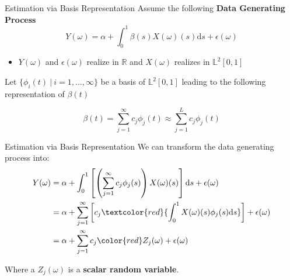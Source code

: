 \documentclass{beamer}
\begin{document}
	\begin{frame}{Estimation via Basis Representation}
		Assume the following \textbf{Data Generating Process}
		$$Y(\omega) = \alpha + \int_{0}^{1} \beta(s) X(\omega)(s) \mathrm{d}s + \epsilon(\omega)$$
		\vspace{-0.6cm}
		\begin{itemize}
			\item $Y(\omega)$ and $\epsilon(\omega)$ realize in $\mathbb{R}$ and $X(\omega)$ realizes in $\mathbb{L}^2[0,1]$
		\end{itemize}
		\vspace{0.3cm}
					
		Let $\{\phi_i(t) \: \vert \: i = 1, \dots, \infty\}$ be a basis of $\mathbb{L}^2[0,1]$ leading to the following representation of $\beta(t)$
		
		$$\beta(t) = \sum_{j = 1}^{\infty} c_j \phi_j(t) \approx \sum_{j = 1}^{L} c_j \phi_j(t)$$

	\end{frame}

	\begin{frame}{Estimation via Basis Representation}
		We can transform the data generating process into:
		\begin{equation}\notag
			\begin{split}
				Y(\omega) & = \alpha + \int_{0}^{1}\left[\left(\sum_{j = 1}^{\infty} c_j  \phi_j(s)\right) X(\omega)(s) \right]\mathrm{d}s + \epsilon(\omega) \\
						  & = \alpha + \sum_{j = 1}^{\infty} \left[c_j \textcolor{red}{\int_{0}^{1} X(\omega)(s) \phi_j(s)\mathrm{d}s}\right] + \epsilon(\omega)	 \\
						  & = \alpha + \sum_{j = 1}^{\infty} c_j {\color{red}Z_j(\omega)} + \epsilon(\omega)  
			\end{split}
		\end{equation}
	
		Where a $Z_j(\omega)$ is a \textbf{scalar random variable}.
	\end{frame}
\end{document}
